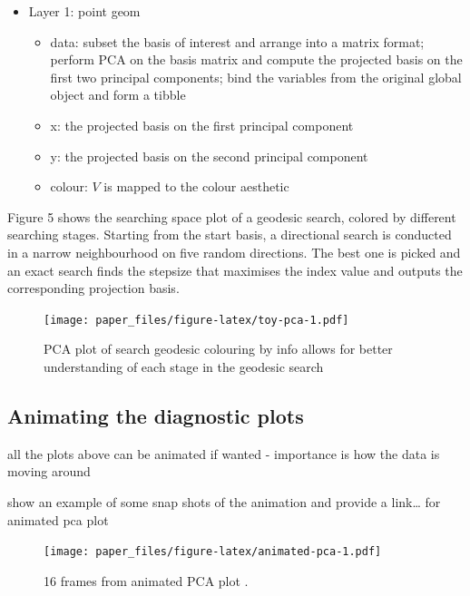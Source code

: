 \documentclass[12pt]{article}
\providecommand{\tightlist}{%
  \setlength{\itemsep}{0pt}\setlength{\parskip}{0pt}}
\begin{document}
\begin{itemize}
\tightlist
\item
  Layer 1: point geom

  \begin{itemize}
  \tightlist
  \item
    data: subset the basis of interest and arrange into a matrix format;
    perform PCA on the basis matrix and compute the projected basis on
    the first two principal components; bind the variables from the
    original global object and form a tibble
  \item
    x: the projected basis on the first principal component
  \item
    y: the projected basis on the second principal component
  \item
    colour: \(V\) is mapped to the colour aesthetic
  \end{itemize}
\end{itemize}

Figure 5 shows the searching space plot of a geodesic search, colored by
different searching stages. Starting from the start basis, a directional
search is conducted in a narrow neighbourhood on five random directions.
The best one is picked and an exact search finds the stepsize that
maximises the index value and outputs the corresponding projection
basis.

\begin{figure}
\centering
\texttt{[image: paper\_files/figure-latex/toy-pca-1.pdf]}
\caption{\label{toy-pca}PCA plot of search geodesic colouring by info
allows for better understanding of each stage in the geodesic search}
\end{figure}

\hypertarget{animating-the-diagnostic-plots}{%
\subsection{Animating the diagnostic
plots}\label{animating-the-diagnostic-plots}}

all the plots above can be animated if wanted - importance is how the
data is moving around

show an example of some snap shots of the animation and provide a
link\ldots{} for animated pca plot

\begin{figure}
\centering
\texttt{[image: paper\_files/figure-latex/animated-pca-1.pdf]}
\caption{\label{animated-pca} 16 frames from animated PCA plot .}
\end{figure}
\end{document}
